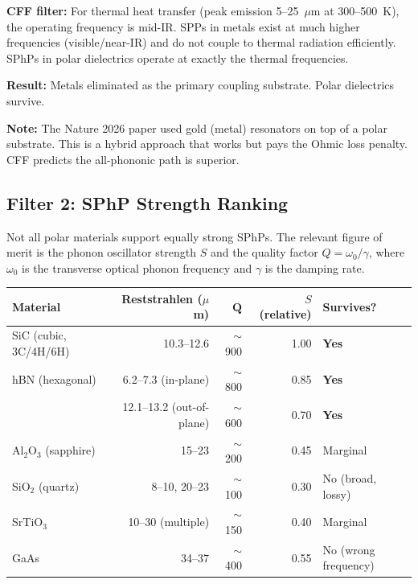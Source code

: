 \documentclass[11pt, a4paper]{article}
\begin{document}
\textbf{CFF filter:} For thermal heat transfer (peak emission
5--25~$\mu$m at 300--500~K), the operating frequency is mid-IR.
SPPs in metals exist at much higher frequencies (visible/near-IR)
and do not couple to thermal radiation efficiently. SPhPs in
polar dielectrics operate at exactly the thermal frequencies.

\textbf{Result:} \textcolor{nm-red}{Metals eliminated as the
primary coupling substrate.} Polar dielectrics survive.

\textbf{Note:} The Nature 2026 paper used gold (metal)
resonators on top of a polar substrate. This is a hybrid
approach that works but pays the Ohmic loss penalty. CFF
predicts the all-phononic path is superior.

\subsection{Filter 2: SPhP Strength Ranking}

Not all polar materials support equally strong SPhPs. The
relevant figure of merit is the phonon oscillator strength
$S$ and the quality factor $Q = \omega_0 / \gamma$, where
$\omega_0$ is the transverse optical phonon frequency and
$\gamma$ is the damping rate.

\begin{center}
\begin{tabular}{@{}lrrrl@{}}
\toprule
\textbf{Material} & \textbf{Reststrahlen ($\mu$m)} &
  $\mathbf{Q}$ & \textbf{$S$ (relative)} &
  \textbf{Survives?} \\
\midrule
SiC (cubic, 3C/4H/6H) & 10.3--12.6 & $\sim$900 & 1.00 &
  \textcolor{nm-green}{\textbf{Yes}} \\
hBN (hexagonal) & 6.2--7.3 (in-plane) & $\sim$800 & 0.85 &
  \textcolor{nm-green}{\textbf{Yes}} \\
 & 12.1--13.2 (out-of-plane) & $\sim$600 & 0.70 &
  \textcolor{nm-green}{\textbf{Yes}} \\
Al$_2$O$_3$ (sapphire) & 15--23 & $\sim$200 & 0.45 &
  \textcolor{nm-orange}{Marginal} \\
SiO$_2$ (quartz) & 8--10, 20--23 & $\sim$100 & 0.30 &
  \textcolor{nm-red}{No (broad, lossy)} \\
SrTiO$_3$ & 10--30 (multiple) & $\sim$150 & 0.40 &
  \textcolor{nm-orange}{Marginal} \\
GaAs & 34--37 & $\sim$400 & 0.55 &
  \textcolor{nm-red}{No (wrong frequency)} \\
\bottomrule
\end{tabular}
\end{center}
\end{document}
